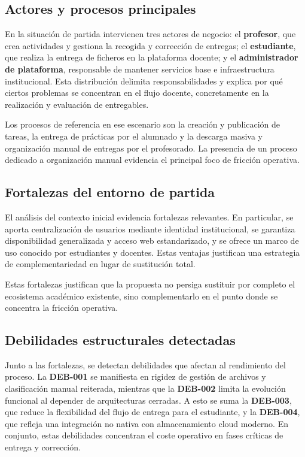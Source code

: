 \subsection{Actores y procesos principales}

En la situaci\'on de partida intervienen tres actores de negocio: el \textbf{profesor}, que crea actividades y gestiona la recogida y correcci\'on de entregas; el \textbf{estudiante}, que realiza la entrega de ficheros en la plataforma docente; y el \textbf{administrador de plataforma}, responsable de mantener servicios base e infraestructura institucional. Esta distribuci\'on delimita responsabilidades y explica por qu\'e ciertos problemas se concentran en el flujo docente, concretamente en la realizaci\'on y evaluaci\'on de entregables.

Los procesos de referencia en ese escenario son la creaci\'on y publicaci\'on de tareas, la entrega de pr\'acticas por el alumnado y la descarga masiva y organizaci\'on manual de entregas por el profesorado. La presencia de un proceso dedicado a organizaci\'on manual evidencia el principal foco de fricci\'on operativa.

\subsection{Fortalezas del entorno de partida}

El an\'alisis del contexto inicial evidencia fortalezas relevantes. En particular, se aporta centralizaci\'on de usuarios mediante identidad institucional, se garantiza disponibilidad generalizada y acceso web estandarizado, y se ofrece un marco de uso conocido por estudiantes y docentes. Estas ventajas justifican una estrategia de complementariedad en lugar de sustituci\'on total.

Estas fortalezas justifican que la propuesta no persiga sustituir por completo
el ecosistema acad\'emico existente,
sino complementarlo en el punto donde se concentra la fricci\'on operativa.

\subsection{Debilidades estructurales detectadas}

Junto a las fortalezas, se detectan debilidades que afectan al rendimiento del proceso. La \textbf{DEB-001} se manifiesta en rigidez de gesti\'on de archivos y clasificaci\'on manual reiterada, mientras que la \textbf{DEB-002} limita la evoluci\'on funcional al depender de arquitecturas cerradas. A esto se suma la \textbf{DEB-003}, que reduce la flexibilidad del flujo de entrega para el estudiante, y la \textbf{DEB-004}, que refleja una integraci\'on no nativa con almacenamiento cloud moderno. En conjunto, estas debilidades concentran el coste operativo en fases cr\'iticas de entrega y correcci\'on.



